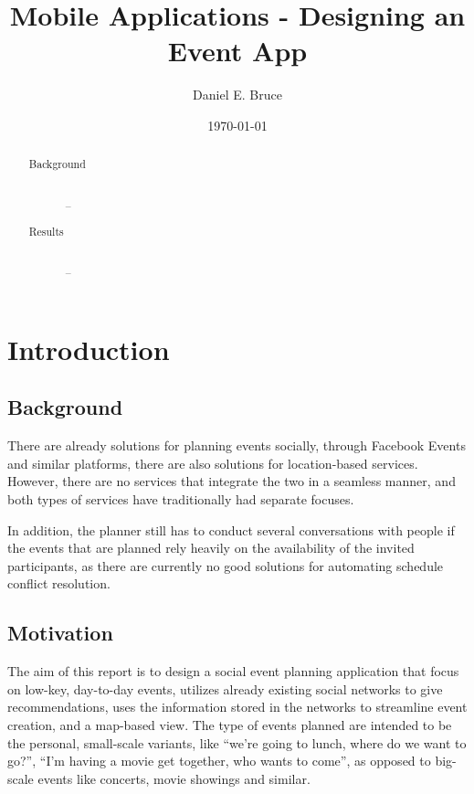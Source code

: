 \documentclass[]{report}
\begin{document}
\title{Mobile Applications - Designing an Event App}
\author{Daniel E. Bruce}
\date{\today}
\maketitle

\begin{abstract}
  \begin{description}
    \item[Background] \hfill \\
      --
    \item[Results] \hfill \\
      --
  \end{description}
\end{abstract}

\tableofcontents

\chapter{Introduction}

\section{Background}

There are already solutions for planning events socially, through Facebook
Events and similar platforms, there are also solutions for location-based
services. However, there are no services that integrate the two in a seamless
manner, and both types of services have traditionally had separate focuses.

In addition, the planner still has to conduct several conversations with people
if the events that are planned rely heavily on the availability of the invited
participants, as there are currently no good solutions for automating schedule
conflict resolution.

\section{Motivation}

The aim of this report is to design a social event planning application
that focus on low-key, day-to-day events, utilizes already existing social
networks to give recommendations, uses the information stored in the networks to
streamline event creation, and a map-based view. The type of events planned are
intended to be the personal, small-scale variants, like ``we're going to lunch,
where do we want to go?'', ``I'm having a movie get together, who wants to
come'', as opposed to big-scale events like concerts, movie showings and
similar.
\end{document}
